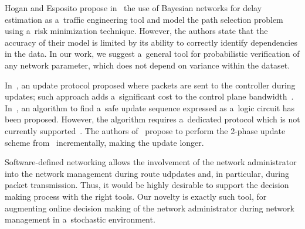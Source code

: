 \begin{multicols}{2}
Hogan and Esposito propose in~\cite{hogan_stochastic_2017} the use of
 Bayesian networks for delay estimation as a~traffic engineering tool and model 
 the path selection problem using a~risk minimization technique. 
 However, the authors state that the accuracy of their model is limited by its 
 ability to correctly identify dependencies in the data. In our work, 
 we suggest a~general tool for probabilistic verification of any network parameter, 
 which does not depend on variance within the dataset.
 
 

In~\cite{mcgeer_safe_2012}, an update protocol proposed where packets are 
sent to the controller during updates; such approach adds 
a~significant cost to the control plane bandwidth~\cite{delaet_seamless_2015}. 
In~\cite{mcgeer_correct_2013}, an algorithm to find 
a~safe update sequence expressed as a~logic circuit has been proposed. 
However, the algorithm 
requires a~dedicated protocol which is not currently 
supported~\cite{foerster_survey_2016}. The authors 
of~\cite{katta_incremental_2013} propose to perform the 2-phase update 
scheme from~\cite{reitblatt_consistent_2011} incrementally, making the update longer. 






Software-defined networking allows the involvement of the network administrator into the network 
management during route udpdates and, in particular, during packet transmission. 
Thus, it would be highly desirable to support the decision making process 
with the right tools. Our novelty is exactly such tool, for augmenting 
online decision making of the network administrator during network management 
in a~stochastic environment.



\end{multicols}

